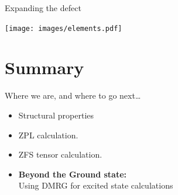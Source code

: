 \documentclass[]{beamer}
\begin{document}
\begin{frame}{Expanding the defect}
  \begin{center}
    \texttt{[image: images/elements.pdf]}
  \end{center}
\end{frame}






\section{Summary} %




\begin{frame}{Where we are, and where to go next\ldots}
  \begin{itemize}
    \item Structural properties
    \item ZPL calculation.
    \item ZFS tensor calculation.
    \item \textbf{Beyond the Ground state:}\\
      Using DMRG for excited state calculations
  \end{itemize}
\end{frame}




\end{document}
